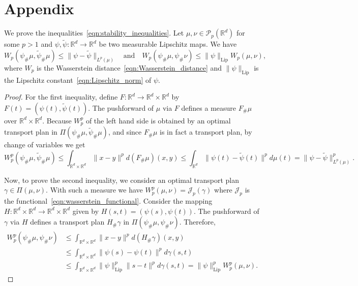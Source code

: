 \documentclass[12pt]{amsart}
\begin{document}



\section*{Appendix}

We prove the inequalities~\eqref{eqn:stability_inequalities}. Let $\mu,\nu\in\mathcal{P}_p(\mathbb{R}^d)$ for some $p>1$ and $\psi, \widetilde{\psi}:\mathbb{R}^d\to\mathbb{R}^d$ be two measurable Lipschitz maps. We have
\begin{equation*}
    W_p(\psi_\#\mu,\widetilde{\psi}_\#\mu) \leq \|\psi-\widetilde{\psi}\|_{L^p(\mu)} \quad \text{and} \quad W_p(\psi_\#\mu,\psi_\#\nu) \leq \|\psi\|_{\text{Lip}}W_p(\mu, \nu),
\end{equation*}
where $W_p$ is the Wasserstein distance~\eqref{eqn:Wasserstein_distance} and $\|\psi\|_{\text{Lip}}$ is the Lipschitz constant~\eqref{eqn:Lipschitz_norm} of $\psi$.

\begin{proof}
    For the first inequality, define $F:\mathbb{R}^d\to\mathbb{R}^d\times\mathbb{R}^d$ by $F(t)=(\psi(t), \widetilde{\psi}(t))$. The pushforward of $\mu$ via $F$ defines a measure $F_\#\mu$ over $\mathbb{R}^d\times\mathbb{R}^d$. Because $W^p_p$ of the left hand side is obtained by an optimal transport plan in $\Pi(\psi_\#\mu, \widetilde{\psi}_\#\mu)$, and since $F_\#\mu$ is in fact a transport plan, by change of variables we get
    \begin{equation*}
        W_p^p(\psi_\#\mu,\widetilde{\psi}_\#\mu)\leq \int_{\mathbb{R}^d\times \mathbb{R}^d} \|x-y\|^p d(F_\#\mu)(x,y) \leq \int_{\mathbb{R}^d} \|\psi(t)-\widetilde{\psi}(t)\|^pd\mu(t) = \|\psi-\widetilde{\psi}\|^p_{L^p(\mu)}.
    \end{equation*}

    Now, to prove the second inequality, we consider an optimal transport plan $\gamma\in\Pi(\mu,\nu)$. With such a measure we have $W^p_p(\mu,\nu)=\mathcal{J}_p(\gamma)$ where $\mathcal{J}_p$ is the functional~\eqref{eqn:wasserstein_functional}. Consider the mapping $H:\mathbb{R}^d\times \mathbb{R}^d\to\mathbb{R}^d\times \mathbb{R}^d$ given by $H(s,t)=(\psi(s), \psi(t))$. The pushforward of $\gamma$ via $H$ defines a transport plan $H_\#\gamma$ in $\Pi(\psi_\#\mu, \psi_\#\nu)$. Therefore,
    \begin{align*}
        W^p_p(\psi_\#\mu,\psi_\#\nu)& \leq\int_{\mathbb{R}^d\times \mathbb{R}^d}\|x-y\|^pd(H_\#\gamma)(x,y) \\
        & \leq \int_{\mathbb{R}^d\times \mathbb{R}^d}\|\psi(s)-\psi(t)\|^pd\gamma(s,t) \\
        & \leq \int_{\mathbb{R}^d\times \mathbb{R}^d} \|\psi\|^p_{\text{Lip}}\|s-t\|^pd\gamma(s,t) = \|\psi\|^p_{\text{Lip}}W^p_p(\mu,\nu).
    \end{align*}
\end{proof}
\end{document}
